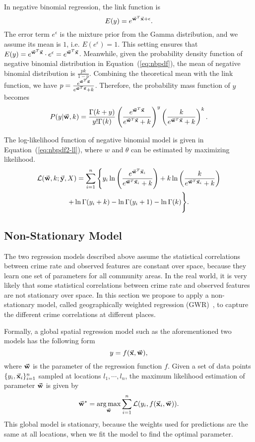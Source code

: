 In negative binomial regression, the link function is
\begin{equation}
E(y) = e^{\vec{\mathbf{w}}^T \vec{\mathbf{x}} + \epsilon }.
\end{equation}
The error term $e^\epsilon$ is the mixture prior from the Gamma distribution, and we assume its mean is $1$, i.e. $E(e^\epsilon) = 1$. This setting ensures that $E(y) = e^{\vec{\mathbf{w}}^T \vec{\mathbf{x}}} \cdot e^\epsilon = e^{\vec{\mathbf{w}}^T \vec{\mathbf{x}}}$. Meanwhile, given the probability density function of negative binomial distribution in Equation~(\ref{eq:nbpdf}), the mean of negative binomial distribution is $\frac{pk}{1-p}$. Combining the theoretical mean with the link function, we have $p = \frac{e^{\vec{\mathbf{w}}^T\vec{\mathbf{x}}}}{e^{\vec{\mathbf{w}}^T\vec{\mathbf{x}}} + k}$. Therefore, the probability mass function of $y$ becomes
\begin{equation}
\label{eq:nbpdf2}
P(y| \vec{\mathbf{w}}, k) = \frac{\Gamma(k+y)}{y! \Gamma(k)} \left(\frac{e^{\vec{\mathbf{w}}^T\vec{\mathbf{x}}}}{e^{\vec{\mathbf{w}}^T\vec{\mathbf{x}}} + k}\right)^y \left(\frac{k}{e^{\vec{\mathbf{w}}^T\vec{\mathbf{x}}} + k}\right)^k.
\end{equation}


The log-likelihood function of negative binomial model is given in Equation~(\ref{eq:nbpdf2-ll}), where $w$ and $\theta$ can be estimated by maximizing likelihood.
\begin{multline}
  \label{eq:nbpdf2-ll}
\mathcal{L}(\vec{\mathbf{w}}, k; \vec{\mathbf{y}}, X) =	\sum_{i=1}^n \Bigg\{y_i \ln\left( \frac{e^{\vec{\mathbf{w}}^T \vec{\mathbf{x}}_i}}{e^{\vec{\mathbf{w}}^T \vec{\mathbf{x}}_i} + k}\right) + k \ln\left(\frac{k}{e^{\vec{\mathbf{w}}^T \vec{\mathbf{x}}_i} +k}\right) \\
	+ \ln \Gamma(y_i + k ) - \ln \Gamma(y_i + 1) - \ln \Gamma( k) \Bigg\}.
\end{multline}



\subsection{Non-Stationary Model}


The two regression models described above assume the statistical correlations between crime rate and observed features are constant over space, because they learn one set of parameters for all community areas. In the real world, it is very likely that some statistical correlations between crime rate and observed features are not stationary over space. In this section we propose to apply a non-stationary model, called geographically weighted regression (GWR)~\cite{FBC03}, to capture the different crime correlations at different places.

Formally, a global spatial regression model such as the aforementioned two models has the following form
\begin{equation}
y = f(\vec{\mathbf{x}}, \vec{\mathbf{w}}),
\end{equation}
where $\vec{\mathbf{w}}$ is the parameter of the regression function $f$. Given a set of data points $\{y_i, \vec{\mathbf{x}}_i\}_{i=1}^n$ sampled at locations $l_1, \cdots, l_n$, the maximum likelihood estimation of parameter $\vec{\mathbf{w}}$ is given by 
\begin{equation}
\vec{\mathbf{w}}^* = \operatorname*{arg\,max}_{\vec{\mathbf{w}}} \sum_{i=1}^n \mathcal{L} (  y_i, f(\vec{\mathbf{x}}_i, \vec{\mathbf{w}}) ).
\end{equation}
This global model is stationary, because the weights used for predictions are the same at all locations, when we fit the model to find the optimal parameter.

